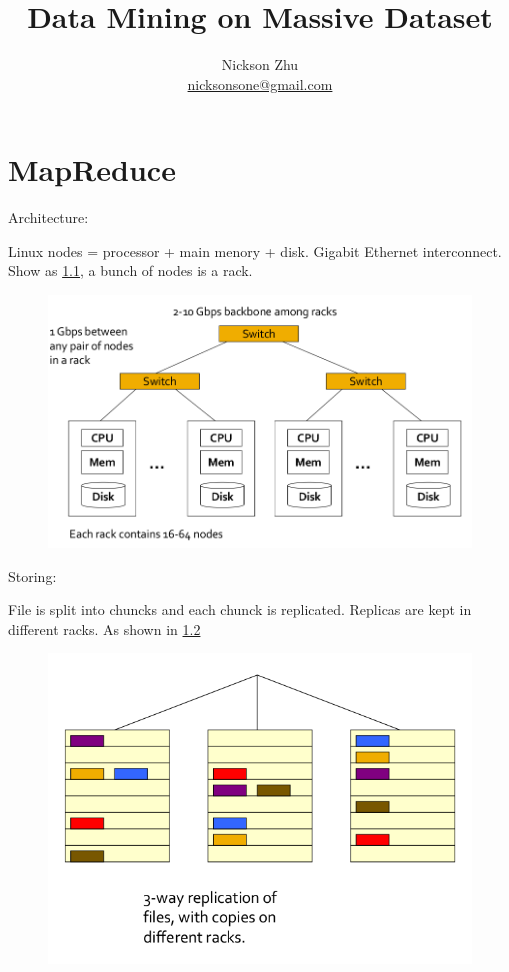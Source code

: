 \documentclass{book}
\title{Data Mining on Massive Dataset}
\author{Nickson Zhu \\ \url{nicksonsone@gmail.com}}
\begin{document}
\maketitle
\tableofcontents
\newpage

\chapter{MapReduce}
Architecture:

Linux nodes = processor + main menory + disk.  Gigabit Ethernet 
interconnect.  Show as \ref{fig:cluster-archi}, a bunch of nodes is a rack.  
\begin{figure}[h]
	\centering
	\includegraphics[scale=0.5]{cluster-archi}
	\label{fig:cluster-archi}
\end{figure}

Storing:

File is split into chuncks and each chunck is replicated.  Replicas are kept 
in different racks.  As shown in \ref{fig:store-files}
\begin{figure}[h]
	\centering
	\includegraphics[scale=0.5]{store-files}
	\label{fig:store-files}
\end{figure}
\end{document}
